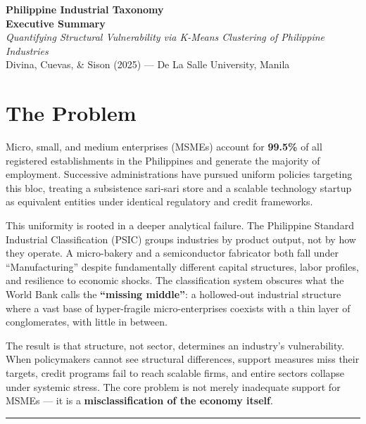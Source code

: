 \documentclass[10pt]{article}
\begin{document}
%
%
\begin{center}
    {\Large\bfseries Philippine Industrial Taxonomy}\\[1pt]
    {\normalsize\bfseries Executive Summary}\\[4pt]
    {\small\itshape Quantifying Structural Vulnerability via K-Means Clustering of Philippine Industries}\\[7pt]
    {\small Divina, Cuevas, \& Sison (2025) --- De La Salle University, Manila}
\end{center}

\vspace{0.3em}

%
%
\section*{The Problem}

Micro, small, and medium enterprises (MSMEs) account for \textbf{99.5\%} of all registered establishments in the Philippines and generate the majority of employment. Successive administrations have pursued uniform policies targeting this bloc, treating a subsistence sari-sari store and a scalable technology startup as equivalent entities under identical regulatory and credit frameworks.

This uniformity is rooted in a deeper analytical failure. The Philippine Standard Industrial Classification (PSIC) groups industries by product output, not by how they operate. A micro-bakery and a semiconductor fabricator both fall under ``Manufacturing'' despite fundamentally different capital structures, labor profiles, and resilience to economic shocks. The classification system obscures what the World Bank calls the \textbf{``missing middle''}: a hollowed-out industrial structure where a vast base of hyper-fragile micro-enterprises coexists with a thin layer of conglomerates, with little in between.

The result is that structure, not sector, determines an industry's vulnerability. When policymakers cannot see structural differences, support measures miss their targets, credit programs fail to reach scalable firms, and entire sectors collapse under systemic stress. The core problem is not merely inadequate support for MSMEs --- it is a \textbf{misclassification of the economy itself}.

\vspace{0.2em}
\hrule
\vspace{0.25em}
\end{document}

